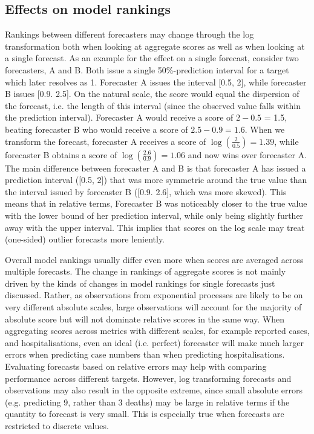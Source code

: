\documentclass{article}
\begin{document}
\subsection{Effects on model rankings}
Rankings between different forecasters may change through the log transformation both when looking at aggregate scores as well as when looking at a single forecast. As an example for the effect on a single forecast, consider two forecasters, A and B. Both issue a single 50\%-prediction interval for a target which later resolves as 1. Forecaster A issues the interval [0.5, 2], while forecaster B issues [0.9. 2.5]. On the natural scale, the score would equal the dispersion of the forecast, i.e. the length of this interval (since the observed value falls within the prediction interval). Forecaster A would receive a score of $2 - 0.5$ = 1.5, beating forecaster B who would receive a score of $2.5 - 0.9 = 1.6$. When we transform the forecast, forecaster A receives a score of $\log (\frac{2}{0.5}) = 1.39$, while forecaster B obtains a score of $\log (\frac{2.6}{0.9}) = 1.06$ and now wins over forecaster A. The main difference between forecaster A and B is that forecaster A has issued a prediction interval ([0.5, 2]) that was more symmetric around the true value than the interval issued by forecaster B ([0.9. 2.6], which was more skewed). This means that in relative terms, Forecaster B was noticeably closer to the true value with the lower bound of her prediction interval, while only being slightly further away with the upper interval. This implies that scores on the log scale may treat (one-sided) outlier forecasts more leniently. 

Overall model rankings usually differ even more when scores are averaged across multiple forecasts. The change in rankings of aggregate scores is not mainly driven by the kinds of changes in model rankings for single forecasts just discussed. Rather, as observations from exponential processes are likely to be on very different absolute scales, large observations will account for the majority of absolute score but will not dominate relative scores in the same way. When aggregating scores across metrics with different scales, for example reported cases, and hospitalisations, even an ideal (i.e. perfect) forecaster will make much larger errors when predicting case numbers than when predicting hospitalisations. Evaluating forecasts based on relative errors may help with comparing performance across different targets. However, log transforming forecasts and observations may also result in the opposite extreme, since small absolute errors (e.g. predicting 9, rather than 3 deaths) may be large in relative terms if the quantity to forecast is very small. This is especially true when forecasts are restricted to discrete values. 
\end{document}
